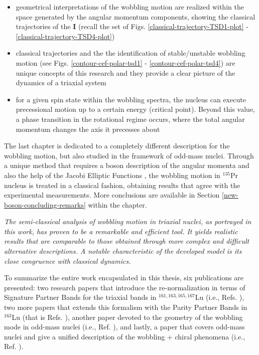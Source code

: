\begin{itemize}
    \item geometrical interpretations of the wobbling motion are realized within the space generated by the angular momentum components, showing the classical trajectories of the $\mathbf{I}$ (recall the set of Figs. \ref{classical-trajectory-TSD1-plot} - \ref{classical-trajectory-TSD4-plot})
    \item classical trajectories and the the identification of stable/unstable wobbling motion (see Figs. \ref{contour-cef-polar-tsd1} - \ref{contour-cef-polar-tsd4}) are unique concepts of this research and they provide a clear picture of the dynamics of a triaxial system
    \item for a given spin state within the wobbling spectra, the nucleus can execute precessional motion up to a certain energy (critical point). Beyond this value, a phase transition in the rotational regime occurs, where the total angular momentum changes the axis it precesses about
\end{itemize}

The last chapter is dedicated to a completely different description for the wobbling motion, but also studied in the framework of odd-mass nuclei. Through a unique method that requires a boson description of the angular momenta and also the help of the Jacobi Elliptic Functions \cite{jacobi1829fundamenta}, the wobbling motion in $^{135}$Pr nucleus is treated in a classical fashion, obtaining results that agree with the experimental measurements. More conclusions are available in Section \ref{new-boson-concluding-remarks} within the chapter.

\emph{The semi-classical analysis of wobbling motion in triaxial nuclei, as portrayed in this work, has proven to be a remarkable and efficient tool. It yields realistic results that are comparable to those obtained through more complex and difficult alternative descriptions. A notable characteristic of the developed model is its close congruence with classical dynamics.}

To summarize the entire work encapsulated in this thesis, six publications are presented: two research papers that introduce the re-normalization in terms of Signature Partner Bands for the triaxial bands in $^{161,163,165,167}$Lu (i.e., Refs. \cite{raduta2020approach,raduta2020towards}), two more papers that extends this formalism with the Parity Partner Bands in $^{163}$Lu (that is Refs. \cite{poenaru2021parity,poenaru2021extensive1}), another paper devoted to the geometry of the wobbling mode in odd-mass nuclei (i.e., Ref. \cite{poenaru2021extensive2}), and lastly, a paper that covers odd-mass nuclei and give a unified description of the wobbling + chiral phenomena (i.e., Ref. \cite{raduta2020new}).